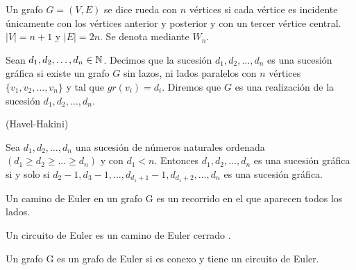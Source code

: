 \begin{definicion}
    Un grafo $G=(V,E)$ se dice rueda con $n$ vértices si cada vértice es incidente únicamente con los vértices anterior y posterior y con un tercer vértice central. $|V| = n+1$ y $|E|=2n$. Se denota mediante $W_n$.
\end{definicion}

\begin{definicion}
    Sean $d_1,d_2,\dots,d_n\in \mathbb{N}$. Decimos que la sucesión $d_1,d_2,\dots,d_n$ es una sucesión gráfica si existe un grafo $G$ sin lazos, ni lados paralelos con $n$ vértices $\{v_1,v_2,\dots,v_n\}$ y tal que $gr(v_i)=d_i$. Diremos que $G$ es una realización de la sucesión $d_1,d_2,\dots,d_n$.
\end{definicion}

\begin{teo}(Havel-Hakini)\ 
    
    Sea $d_1,d_2,\dots,d_n$ una sucesión de números naturales ordenada $(d_1 \geq d_2 \geq \dots \geq d_n)$ y con $d_1 < n$. Entonces $d_1,d_2,\dots,d_n$ es una sucesión gráfica si y solo si $d_2-1, d_3-1,\dots,d_{d_1+1}-1,d_{d_1+2},\dots,d_n$ es una sucesión gráfica.
\end{teo}

\begin{definicion}
    Un camino de Euler en un grafo G es un recorrido en el que aparecen todos los lados.
\end{definicion}

\begin{definicion}
    Un circuito de Euler es un camino de Euler cerrado .
\end{definicion}

\begin{definicion}
    Un grafo G es un grafo de Euler si es conexo y tiene un circuito de Euler.
\end{definicion}

